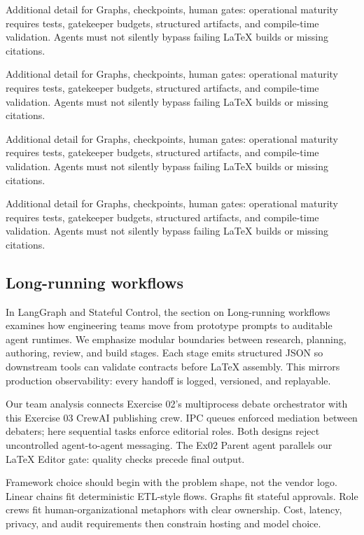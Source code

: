 Additional detail for Graphs, checkpoints, human gates: operational maturity requires tests, gatekeeper budgets, structured artifacts, and compile-time validation. Agents must not silently bypass failing LaTeX builds or missing citations. \cite{crewai2024} \cite{langgraph2024} \cite{mcp2024}

Additional detail for Graphs, checkpoints, human gates: operational maturity requires tests, gatekeeper budgets, structured artifacts, and compile-time validation. Agents must not silently bypass failing LaTeX builds or missing citations. \cite{crewai2024} \cite{langgraph2024} \cite{mcp2024}

Additional detail for Graphs, checkpoints, human gates: operational maturity requires tests, gatekeeper budgets, structured artifacts, and compile-time validation. Agents must not silently bypass failing LaTeX builds or missing citations. \cite{crewai2024} \cite{langgraph2024} \cite{mcp2024}

Additional detail for Graphs, checkpoints, human gates: operational maturity requires tests, gatekeeper budgets, structured artifacts, and compile-time validation. Agents must not silently bypass failing LaTeX builds or missing citations. \cite{crewai2024} \cite{langgraph2024} \cite{mcp2024}

\subsection{Long-running workflows}
In LangGraph and Stateful Control, the section on Long-running workflows examines how engineering teams move from prototype prompts to auditable agent runtimes. We emphasize modular boundaries between research, planning, authoring, review, and build stages. Each stage emits structured JSON so downstream tools can validate contracts before LaTeX assembly. This mirrors production observability: every handoff is logged, versioned, and replayable. \cite{crewai2024} \cite{langgraph2024} \cite{mcp2024}

Our team analysis connects Exercise 02's multiprocess debate orchestrator with this Exercise 03 CrewAI publishing crew. IPC queues enforced mediation between debaters; here sequential tasks enforce editorial roles. Both designs reject uncontrolled agent-to-agent messaging. The Ex02 Parent agent parallels our LaTeX Editor gate: quality checks precede final output. \cite{crewai2024} \cite{langgraph2024} \cite{mcp2024}

Framework choice should begin with the problem shape, not the vendor logo. Linear chains fit deterministic ETL-style flows. Graphs fit stateful approvals. Role crews fit human-organizational metaphors with clear ownership. Cost, latency, privacy, and audit requirements then constrain hosting and model choice. \cite{crewai2024} \cite{langgraph2024} \cite{mcp2024}

